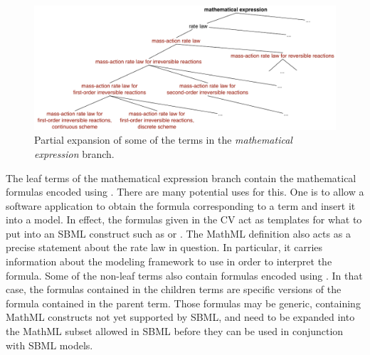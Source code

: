 \begin{figure}[tbh]
  \centering
  \includegraphics[scale = 0.8]{figs/sbo-math-expression}
  \caption{Partial expansion of some of the terms in the \emph{mathematical
      expression} branch.}
  \label{fig:sbo-math-expression}
\end{figure}

The leaf terms of the mathematical expression branch contain the mathematical formulas encoded using \mathmltwo.  There are many potential uses
for this.  One is to allow a software application to obtain the
formula corresponding to a term and insert it into a model.  In effect, the formulas given
in the CV act as templates for what to put into an SBML construct such as
\KineticLaw or \Rule.  The MathML definition also acts as a
precise statement about the rate law in question. In particular, it carries information about the modeling framework to use in order to interpret the formula.  Some of the
non-leaf terms also contain formulas encoded using \mathmltwo. In that case, the formulas contained in the children terms are specific versions of the formula contained in the parent term. 
Those formulas may be generic, containing MathML constructs
not yet supported by SBML, and need to be expanded into
the MathML subset allowed in SBML before they can be
used in conjunction with SBML models.

